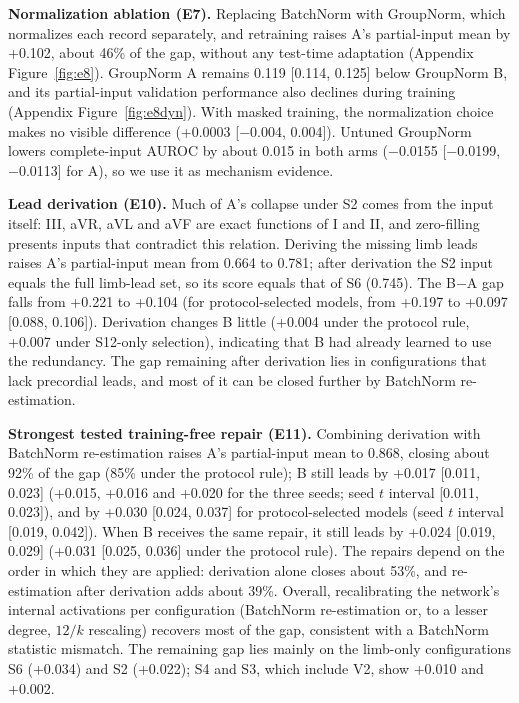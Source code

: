 \textbf{Normalization ablation (E7).} Replacing BatchNorm with GroupNorm, which normalizes each record separately, and retraining raises A's partial-input mean by +0.102, about 46\% of the gap, without any test-time adaptation (Appendix Figure~\ref{fig:e8}). GroupNorm A remains 0.119 [0.114, 0.125] below GroupNorm B, and its partial-input validation performance also declines during training (Appendix Figure~\ref{fig:e8dyn}). With masked training, the normalization choice makes no visible difference (+0.0003 [$-$0.004, 0.004]). Untuned GroupNorm lowers complete-input AUROC by about 0.015 in both arms ($-$0.0155 [$-$0.0199, $-$0.0113] for A), so we use it as mechanism evidence.

\textbf{Lead derivation (E10).} Much of A's collapse under S2 comes from the input itself: III, aVR, aVL and aVF are exact functions of I and II, and zero-filling presents inputs that contradict this relation. Deriving the missing limb leads raises A's partial-input mean from 0.664 to 0.781; after derivation the S2 input equals the full limb-lead set, so its score equals that of S6 (0.745). The B$-$A gap falls from +0.221 to +0.104 (for protocol-selected models, from +0.197 to +0.097 [0.088, 0.106]). Derivation changes B little (+0.004 under the protocol rule, +0.007 under S12-only selection), indicating that B had already learned to use the redundancy. The gap remaining after derivation lies in configurations that lack precordial leads, and most of it can be closed further by BatchNorm re-estimation.

\textbf{Strongest tested training-free repair (E11).} Combining derivation with BatchNorm re-estimation raises A's partial-input mean to 0.868, closing about 92\% of the gap (85\% under the protocol rule); B still leads by +0.017 [0.011, 0.023] (+0.015, +0.016 and +0.020 for the three seeds; seed $t$ interval [0.011, 0.023]), and by +0.030 [0.024, 0.037] for protocol-selected models (seed $t$ interval [0.019, 0.042]). When B receives the same repair, it still leads by +0.024 [0.019, 0.029] (+0.031 [0.025, 0.036] under the protocol rule). The repairs depend on the order in which they are applied: derivation alone closes about 53\%, and re-estimation after derivation adds about 39\%. Overall, recalibrating the network's internal activations per configuration (BatchNorm re-estimation or, to a lesser degree, $12/k$ rescaling) recovers most of the gap, consistent with a BatchNorm statistic mismatch. The remaining gap lies mainly on the limb-only configurations S6 (+0.034) and S2 (+0.022); S4 and S3, which include V2, show +0.010 and +0.002.

